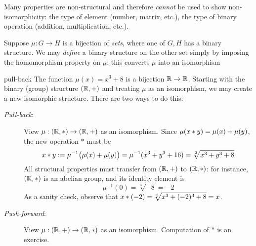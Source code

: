 Many properties are non-structural and therefore \emph{cannot} be used to show non-isomorphicity: the type of element (number, matrix, etc.), the type of binary operation (addition, multiplication, etc.).




Suppose $\mu:G\to H$ is a bijection of \emph{sets}, where one of $G,H$ has a binary structure. We may \emph{define} a binary structure on the other set simply by imposing the homomorphism property on $\mu$: this converts $\mu$ into an isomorphism

\begin{example}{}{pull-back}
  The function $\mu(x)=x^3+8$ is a bijection $\mathbb{R}\to\mathbb{R}$. Starting with the binary (group) structure $(\mathbb{R},+)$ and treating $\mu$ as an isomorphism, we may create a new isomorphic structure. There are two ways to do this:
  \begin{description}
  	\item[\emph{Pull-back}:] View $\mu:(\mathbb{R},*)\to (\mathbb{R},+)$ as an isomorphism. Since $\mu(x\mathbin{\ast} y)=\mu(x)+\mu(y)$, the new operation $\ast$ must be
			\[
				x\mathbin{\ast} y:=\mu^{-1}\bigl(\mu(x)+\mu(y)\bigr) 
				=\mu^{-1}(x^3+y^3+16) 
				=\sqrt[3]{x^3+y^3+8}
			\]
			All structural properties must transfer from $(\mathbb{R},+)$ to $(\mathbb{R},*)$: for instance, $(\mathbb{R},*)$ is an abelian group, and its identity element is
			\[
				\mu^{-1}(0)=\sqrt[3]{-8}=-2
			\]
			As a sanity check, observe that $x\mathbin{\ast} (-2)=\sqrt[3]{x^3+(-2)^3+8}=x$.
			\item[\emph{Push-forward}:] View $\mu:(\mathbb{R},+)\to (\mathbb{R},*)$ as an isomorphism. Computation of $*$ is an exercise.
  \end{description} 
\end{example}




